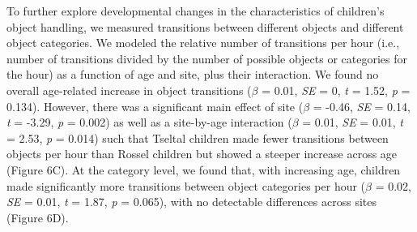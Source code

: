 \documentclass[10pt, letterpaper]{article}
\begin{document}
To further explore developmental changes in the characteristics of
children's object handling, we measured transitions between different
objects and different object categories. We modeled the relative number
of transitions per hour (i.e., number of transitions divided by the
number of possible objects or categories for the hour) as a function of
age and site, plus their interaction. We found no overall age-related
increase in object transitions (\(\beta\) = 0.01, \emph{SE} = 0,
\emph{t} = 1.52, \emph{p} = 0.134). However, there was a significant
main effect of site (\(\beta\) = -0.46, \emph{SE} = 0.14, \emph{t} =
-3.29, \emph{p} = 0.002) as well as a site-by-age interaction (\(\beta\)
= 0.01, \emph{SE} = 0.01, \emph{t} = 2.53, \emph{p} = 0.014) such that
Tseltal children made fewer transitions between objects per hour than
Rossel children but showed a steeper increase across age (Figure 6C). At
the category level, we found that, with increasing age, children made
significantly more transitions between object categories per hour
(\(\beta\) = 0.02, \emph{SE} = 0.01, \emph{t} = 1.87, \emph{p} = 0.065),
with no detectable differences across sites (Figure 6D).
\end{document}
